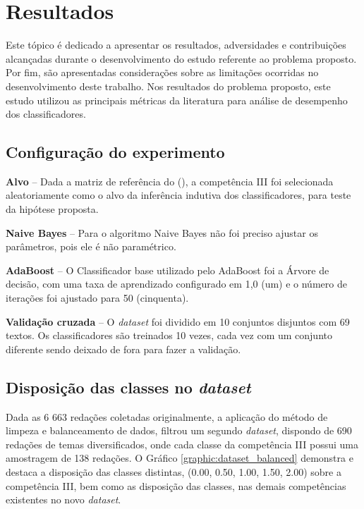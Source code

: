 \section{Resultados}

Este tópico é dedicado a apresentar os resultados, adversidades e contribuições 
alcançadas durante o desenvolvimento do estudo referente ao problema proposto. 
Por fim, são apresentadas considerações sobre as limitações ocorridas no 
desenvolvimento deste trabalho. Nos resultados do problema proposto, este 
estudo utilizou as principais métricas da literatura para análise de desempenho 
dos classificadores.

\subsection{Configuração do experimento}
\label{subsection:configuracao}

\textbf{Alvo} -- Dada a matriz de referência do \citeauthor{edital_enem:2016} 
(\citeyear{edital_enem:2016}), a competência III foi selecionada 
aleatoriamente como o alvo da inferência indutiva dos classificadores, para 
teste da hipótese proposta.

\textbf{Naive Bayes} -- Para o algoritmo Naive Bayes não foi preciso ajustar os
parâmetros, pois ele é não paramétrico.

\textbf{AdaBoost} -- O Classificador base utilizado pelo AdaBoost foi a
Árvore de decisão, com uma taxa de aprendizado configurado em 1,0 (um) e o 
número de iterações foi ajustado para 50 (cinquenta).

\textbf{Validação cruzada} -- O \textit{dataset} foi dividido em 10 conjuntos 
disjuntos com 69 textos. Os classificadores são treinados 10 vezes, cada 
vez com um conjunto diferente sendo deixado de fora para fazer a validação.

\subsection{Disposição das classes no \textit{dataset}}
\label{subsection:balanceamento}

Dada as 6 663 redações coletadas originalmente, a aplicação do método de 
limpeza e balanceamento de dados, filtrou um segundo \textit{dataset}, dispondo 
de 690 redações de temas diversificados, onde cada classe da competência III 
possui uma amostragem de 138 redações. O Gráfico \ref{graphic:dataset_balanced} 
demonstra e destaca a disposição das classes distintas, (0.00, 0.50, 1.00, 
1.50, 2.00) sobre a competência III, bem como as disposição das classes, nas 
demais competências existentes no novo \textit{dataset}.

